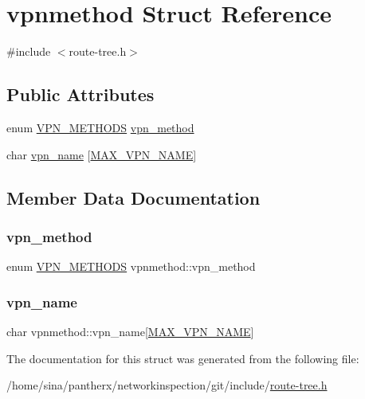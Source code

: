 \hypertarget{structvpnmethod}{}\section{vpnmethod Struct Reference}
\label{structvpnmethod}


{\ttfamily \#include $<$route-\/tree.\+h$>$}

\subsection*{Public Attributes}
\begin{DoxyCompactItemize}
\item 
enum \hyperlink{route-tree_8h_a5b876670828c4e38106ba1c6d91024b7}{V\+P\+N\+\_\+\+M\+E\+T\+H\+O\+DS} \hyperlink{structvpnmethod_a33fa9abeccb46523aba83364fc44990f}{vpn\+\_\+method}
\item 
char \hyperlink{structvpnmethod_ac221598ca4c95900ae5b9fa404cbdb4d}{vpn\+\_\+name} \mbox{[}\hyperlink{route-tree_8h_a77ed9a5f9670b7a2d69c376d1199eddf}{M\+A\+X\+\_\+\+V\+P\+N\+\_\+\+N\+A\+ME}\mbox{]}
\end{DoxyCompactItemize}


\subsection{Member Data Documentation}
\mbox{\label{structvpnmethod_a33fa9abeccb46523aba83364fc44990f}} 
\subsubsection{\texorpdfstring{vpn\+\_\+method}{vpn\_method}}
{\footnotesize\ttfamily enum \hyperlink{route-tree_8h_a5b876670828c4e38106ba1c6d91024b7}{V\+P\+N\+\_\+\+M\+E\+T\+H\+O\+DS} vpnmethod\+::vpn\+\_\+method}

\mbox{\label{structvpnmethod_ac221598ca4c95900ae5b9fa404cbdb4d}} 
\subsubsection{\texorpdfstring{vpn\+\_\+name}{vpn\_name}}
{\footnotesize\ttfamily char vpnmethod\+::vpn\+\_\+name\mbox{[}\hyperlink{route-tree_8h_a77ed9a5f9670b7a2d69c376d1199eddf}{M\+A\+X\+\_\+\+V\+P\+N\+\_\+\+N\+A\+ME}\mbox{]}}



The documentation for this struct was generated from the following file\+:\begin{DoxyCompactItemize}
\item 
/home/sina/pantherx/networkinspection/git/include/\hyperlink{route-tree_8h}{route-\/tree.\+h}\end{DoxyCompactItemize}
